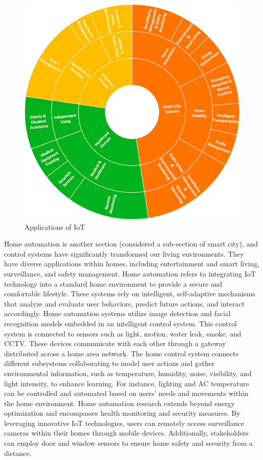 \begin{center}
    \begin{figure}[!htp]
        \centering
        \includegraphics[width=0.8 \textwidth]{image/application_iot.png}
        \caption{Applications of IoT}
        \label{subsection}
    \end{figure}
    \end{center}

Home automation is another section (considered a sub-section of smart city), and control systems have significantly transformed our living environments. They have diverse applications within homes, including entertainment and smart living, surveillance, and safety management. Home automation refers to integrating IoT technology into a standard home environment to provide a secure and comfortable lifestyle. These systems rely on intelligent, self-adaptive mechanisms that analyze and evaluate user behaviors, predict future actions, and interact accordingly.  Home automation systems utilize image detection and facial recognition models embedded in an intelligent control system.
This control system is connected to sensors such as light, motion, water leak, smoke, and CCTV. These devices communicate with each other through a gateway distributed across a home area network. The home control system connects different subsystems collaborating to model user actions and gather environmental information, such as temperature, humidity, noise, visibility, and light intensity, to enhance learning.  For instance, lighting and AC temperature can be controlled and automated based on users' needs and movements within the home environment. Home automation research extends beyond energy optimization and encompasses health monitoring and security measures. 
By leveraging innovative IoT technologies, users can remotely access surveillance cameras within their homes through mobile devices. Additionally, stakeholders can employ door and window sensors to ensure home safety and security from a distance.

